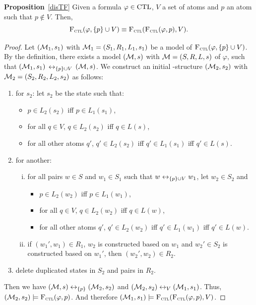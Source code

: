 \documentclass[letterpaper]{article} %
\begin{document}
\noindent\textbf{Proposition}~\ref{disTF} Given a formula $\varphi \in \textrm{CTL}$, $V$ a set of atoms and $p$ an atom such that $p \notin V$. Then,
\[
{\textsc{F}_{\textsc{ctl}}}(\varphi, \{p\} \cup V) \equiv {\textsc{F}_{\textsc{ctl}}}({\textsc{F}_{\textsc{ctl}}}(\varphi, p), V).
\]
\begin{proof}
Let $({\cal M}_1, s_1) $ with ${\cal M}_1=(S_1, R_1, L_1,s_1)$ be a model of ${\textsc{F}_{\textsc{ctl}}}(\varphi, \{p\} \cup V)$. By the definition, there exists a model $({\cal M},s)$ with ${\cal M} = (S, R,L,s)$ of $\varphi$, such that $({\cal M}_1, s_1)$ $\leftrightarrow_{\{p\} \cup V}$ $({\cal M}, s)$. We construct an initial \MPK-structure $({\cal M}_2, s_2)$ with ${\cal M}_2 = (S_2, R_2, L_2,s_2)$ as follows:
\begin{enumerate}[(1)]
  \item for $s_2$: let $s_2$ be the state such that:
  \begin{itemize}
    \item $p \in L_2(s_2)$ iff $p \in L_1(s_1)$,
    \item for all $q \in V$, $q \in L_2(s_2)$ iff $q\in L(s)$,
    \item for all other atoms $q'$, $q' \in L_2(s_2)$ iff $q' \in L_1(s_1)$ iff $q'\in L(s)$.
  \end{itemize}
  \item for another:
  \begin{enumerate}[(i)]
    \item for all pairs  $w \in S$ and $w_1 \in S_1$ such that $w \leftrightarrow_{\{p\} \cup V} w_1$, let $w_2 \in S_2$ and
        \begin{itemize}
          \item $p \in L_2(w_2)$ iff $p \in L_1(w_1)$,
          \item for all $q \in V$, $q \in L_2(w_2)$ iff $q\in L(w)$,
          \item for all other atoms $q'$, $q' \in L_2(w_2)$ iff $q' \in L_1(w_1)$ iff $q'\in L(w)$.
        \end{itemize}
    \item if $(w_1', w_1)\in R_1$, $w_2$ is constructed based on $w_1$ and $w_2'\in S_2$ is constructed based on $w_1'$, then $(w_2', w_2)\in R_2$.
  \end{enumerate}
  \item delete duplicated states in $S_2$ and pairs in $R_2$.
\end{enumerate}
Then we have $({\cal M}, s) \leftrightarrow_{\{p\}} ({\cal M}_2, s_2)$ and $({\cal M}_2, s_2) \leftrightarrow_V ({\cal M}_1, s_1)$. Thus, $({\cal M}_2, s_2) \models {\textsc{F}_{\textsc{ctl}}}(\varphi, p)$. And therefore $({\cal M}_1, s_1) \models {\textsc{F}_{\textsc{ctl}}}({\textsc{F}_{\textsc{ctl}}}(\varphi, p), V)$.


\end{proof}
\end{document}
